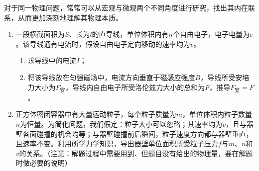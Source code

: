 对于同一物理问题，常常可以从宏观与微观两个不同角度进行研究，找出其内在联系，从而更加深刻地理解其物理本质。
\begin{enumerate}
	\item[(1)] 一段横截面积为\(S\)、长为\(l\)的直导线，单位体积内有\(n\)个自由电子，电子电量为\(e\)。该导线通有电流时，假设自由电子定向移动的速率均为\(v\)。
	\begin{enumerate}
		\item[(a)] 求导线中的电流\(I\)；
		\item[(b)] 将该导线放在匀强磁场中，电流方向垂直于磁感应强度\(B\)，导线所受安培力大小为\(F_\text{安}\)，导线内自由电子所受洛伦兹力大小的总和为\(F\)，推导\(F_\text{安}=F\)。
	\end{enumerate}
	\item[(2)] 正方体密闭容器中有大量运动粒子，每个粒子质量为\(m\)，单位体积内粒子数量\(n\)为恒量。为简化问题，我们假定：粒子大小可以忽略；其速率均为\(v\)，且与器壁各面碰撞的机会均等；与器壁碰撞前后瞬间，粒子速度方向都与器壁垂直，且速率不变。利用所学力学知识，导出器壁单位面积所受粒子压力\(f\)与\(m\)、\(n\)和\(v\)的关系。（注意：解题过程中需要用到、但题目没有给出的物理量，要在解题时做必要的说明）
\end{enumerate}	
